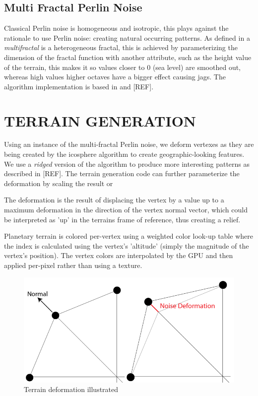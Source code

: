 \documentclass[a4paper,twoside]{article}
\begin{document}
\subsection{Multi Fractal Perlin Noise}
\label{sec:mfpnois}
Classical Perlin noise is homogeneous and isotropic, this plays against the rationale to use Perlin noise: creating natural occurring patterns.  As defined in \cite{ondrej07} a \textit{multifractal} is a heterogeneous fractal, this is achieved by parameterizing the dimension of the fractal function with another attribute, such as the height value of the terrain, this makes it so values closer to 0 (sea level) are smoothed out, whereas high values higher octaves have a bigger effect causing jags.  The algorithm implementation is based in \cite{pnoise} and [REF].

\section{\uppercase{Terrain Generation}}
\label{sec:tgeneration}

\noindent Using an instance of the multi-fractal Perlin noise, we deform vertexes as they are being created by the icosphere algorithm to create geographic-looking features. We use a \textit{ridged} version of the algorithm to produce more interesting patterns as described in [REF]. The terrain generation code can further parameterize the deformation by scaling the result or 

The deformation is the result of displacing the vertex by a value up to a maximum deformation in the direction of the vertex normal vector, which could be interpreted as 'up' in the terrains frame of reference, thus creating a relief.

Planetary terrain is colored per-vertex using a weighted color look-up table where the index is calculated using the vertex's 'altitude' (simply the magnitude of the vertex's position). The vertex colors are interpolated by the GPU and then applied per-pixel rather than using a texture.

\begin{figure}
\centering
\includegraphics[scale=0.25]{./images/normals_deformation.png}
\caption{Terrain deformation illustrated}
\label{fig_tda}
\end{figure}
\end{document}

